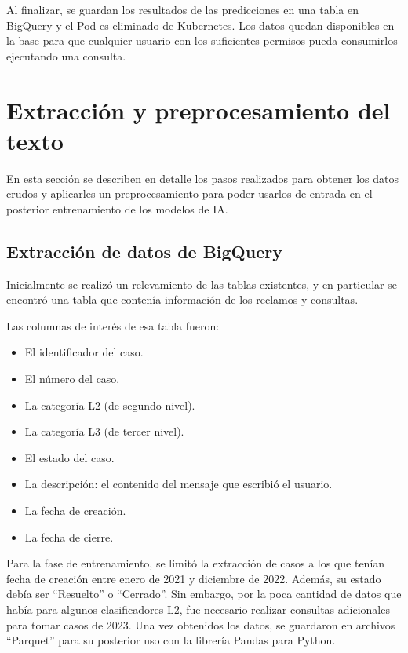 Al finalizar, se guardan los resultados de las predicciones en una tabla en BigQuery y el Pod es eliminado de Kubernetes. Los datos quedan disponibles en la base para que cualquier usuario con los suficientes permisos pueda consumirlos ejecutando una consulta.

\section{Extracción y preprocesamiento del texto}

En esta sección se describen en detalle los pasos realizados para obtener los datos crudos y aplicarles un preprocesamiento para poder usarlos de entrada en el posterior entrenamiento de los modelos de IA.

\subsection{Extracción de datos de BigQuery}
\label{sec:extraccion}

Inicialmente se realizó un relevamiento de las tablas existentes, y en particular se encontró una tabla que contenía información de los reclamos y consultas. 

Las columnas de interés de esa tabla fueron:
\begin{itemize}
	\item El identificador del caso.
	\item El número del caso.
	\item La categoría L2 (de segundo nivel).
	\item La categoría L3 (de tercer nivel).
	\item El estado del caso.
	\item La descripción: el contenido del mensaje que escribió el usuario.
	\item La fecha de creación.
	\item La fecha de cierre.
\end{itemize}

Para la fase de entrenamiento, se limitó la extracción de casos a los que tenían fecha de creación entre enero de 2021 y diciembre de 2022. Además, su estado debía ser ``Resuelto'' o ``Cerrado''. Sin embargo, por la poca cantidad de datos que había para algunos clasificadores L2, fue necesario realizar consultas adicionales para tomar casos de 2023. Una vez obtenidos los datos, se guardaron en archivos ``Parquet'' para su posterior uso con la librería Pandas para Python.

